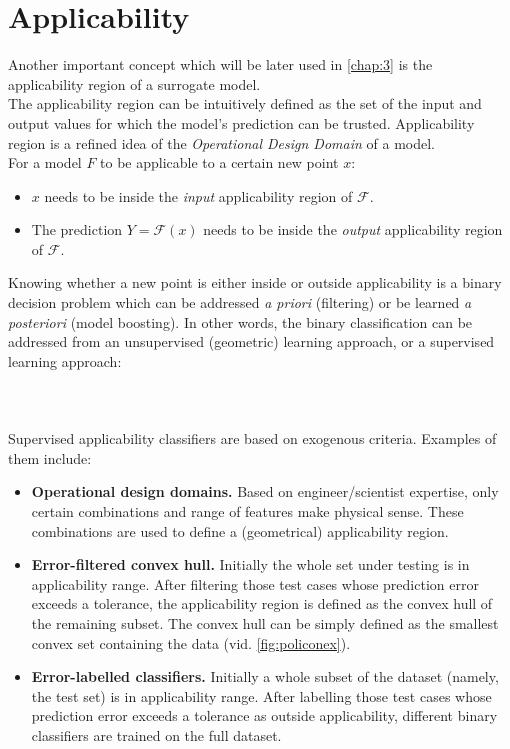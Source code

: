 \section{Applicability}
Another important concept which will be later used in \autoref{chap:3} is the applicability region of a surrogate model.\\
\indent The applicability region can be intuitively defined as the set of the input and output values for which the model's prediction can be trusted. Applicability region is a refined idea of the \textit{Operational Design Domain} of a model.\\
\indent For a model $F$ to be applicable to a certain new point $x$:
\begin{itemize}
	\item $x$ needs to be inside the \textit{input} applicability region of $\mathcal{F}$.
	\item The prediction $Y=\mathcal{F}(x)$ needs to be inside the \textit{output} applicability region of $\mathcal{F}$.\\
\end{itemize}
%
\indent Knowing whether a new point is either inside or outside applicability is a binary decision problem which can be addressed \textit{a priori} (filtering) or be learned \textit{a posteriori} (model boosting). In other words, the binary classification can be addressed from an unsupervised (geometric) learning approach, or a supervised learning approach:
\paragraph{ \\}
Supervised applicability classifiers are based on exogenous criteria. Examples of them include:
\begin{itemize}
	\item \textbf{Operational design domains.} Based on engineer/scientist expertise, only certain combinations and range of features make physical sense. These combinations are used to define a (geometrical) applicability region.
	\item \textbf{Error-filtered convex hull.} Initially the whole set under testing is in applicability range. After filtering those test cases whose prediction error exceeds a tolerance, the applicability region is defined as the convex hull of the remaining subset. The convex hull can be simply defined as the smallest convex set containing the data\cite{Preparata1985} (vid. \cref{fig:policonex}).
	\item \textbf{Error-labelled classifiers.} Initially a whole subset of the dataset (namely, the test set) is in applicability range. After labelling those test cases whose prediction error exceeds a tolerance as outside applicability, different binary classifiers are trained on the full dataset.\\
\end{itemize}

